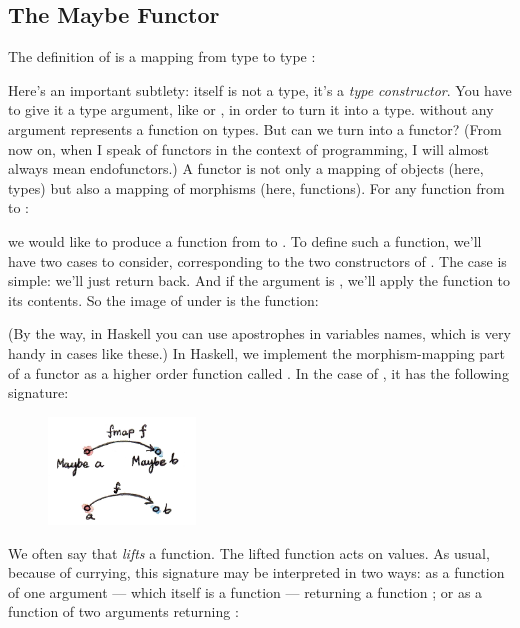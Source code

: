 \subsection{The Maybe Functor}

The definition of  is a mapping from type  to
type :

Here's an important subtlety:  itself is not a type, it's
a \emph{type constructor}. You have to give it a type argument, like
 or , in order to turn it into a type.
 without any argument represents a function on types. But
can we turn  into a functor? (From now on, when I speak of
functors in the context of programming, I will almost always mean
endofunctors.) A functor is not only a mapping of objects (here, types)
but also a mapping of morphisms (here, functions). For any function from
 to :

we would like to produce a function from  to
. To define such a function, we'll have two cases to
consider, corresponding to the two constructors of . The
 case is simple: we'll just return 
back. And if the argument is , we'll apply the function
 to its contents. So the image of  under
 is the function:

(By the way, in Haskell you can use apostrophes in variables names,
which is very handy in cases like these.) In Haskell, we implement the
morphism-mapping part of a functor as a higher order function called
. In the case of , it has the following
signature:


\begin{figure}[H]
\centering
\includegraphics[width=0.35\textwidth]{images/functormaybe.jpg}
\end{figure}

\noindent
We often say
that  \emph{lifts} a function. The lifted function acts on
 values. As usual, because of currying, this signature may
be interpreted in two ways: as a function of one argument --- which
itself is a function  --- returning a
function ; or as a
function of two arguments returning :

